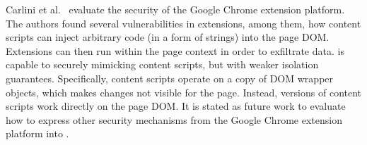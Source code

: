 Carlini et al.~\cite{Carlini:2012} evaluate the security of the Google Chrome
extension platform. The authors found several vulnerabilities in extensions, among them,
how content scripts can inject arbitrary code (in a form of strings) into the
page DOM. Extensions can then run within the page context in order
to exfiltrate data. \sys{} is capable to securely mimicking content scripts, but
with  weaker isolation guarantees.  Specifically, content scripts operate on a
copy of DOM wrapper objects, which makes changes not visible for the
page. Instead, \sys{} versions of content scripts work directly on the page DOM.
It is stated as future work to evaluate how to express other 
security mechanisms from the Google Chrome extension platform into \sys{}. 

 
 

